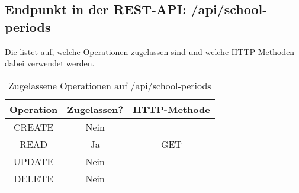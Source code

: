 \subsection{Endpunkt in der REST-API: /api/school-periods}
\label{sec:end:rest:api:schools-periods}
Die  listet auf, welche Operationen zugelassen sind und welche HTTP-Methoden dabei verwendet werden. 


\begin{table}[!htbp]
	\begin{tabular}{|c|c|c|}
		\hline
			\textbf{Operation} & \textbf{Zugelassen?} & \textbf{HTTP-Methode} \\ \hline
			CREATE & Nein & \\ \hline 
			READ & Ja & GET \\ \hline
			UPDATE & Nein & \\ \hline 
			DELETE & Nein & \\ \hline
	\end{tabular}

		\caption{Zugelassene Operationen auf /api/school-periods}
		\label{tab:end:rest:api:schools_years:meth}
\end{table}